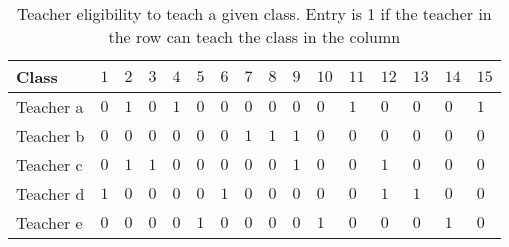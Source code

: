 \documentclass[11pt]{article}
\begin{document}
\begin{table}[h!]
\begin{tabular}{|a||l|l|l|l|l|l|l|l|l|l|l|l|l|l|l|} \hline
{}Class & $1$ & $2$ & $3$ & $4$ & $5$ & $6$ &
$7$ & $8$ & $9$ & $10$ & $11$ & $12$ & $13$
& $14$ & $15$ \\ \hline \hline
Teacher a & $0$ & $1$ & $0$ & $1$ & $0$ & $0$
& $0$ & $0$ & $0$ & $0$ & $1$ & $0$ & $0$
& $0$ & $1$ \\ \hline
Teacher b & $0$ & $0$ & $0$ & $0$ & $0$ & $0$
& $1$ & $1$ & $1$ & $0$ & $0$ & $0$ & $0$
& $0$ & $0$ \\ \hline
Teacher c & $0$ & $1$ & $1$ & $0$ & $0$ & $0$
& $0$ & $0$ & $1$ & $0$ & $0$ & $1$ & $0$
& $0$ & $0$ \\ \hline
Teacher d & $1$ & $0$ & $0$ & $0$ & $0$ & $1$
& $0$ & $0$ & $0$ & $0$ & $0$ & $1$ & $1$
& $0$ & $0$ \\ \hline
Teacher e & $0$ & $0$ & $0$ & $0$ & $1$ & $0$
& $0$ & $0$ & $0$ & $1$ & $0$ & $0$ & $0$
& $1$ & $0$ \\ \hline
\end{tabular}
\caption{Teacher eligibility to teach a given class. Entry is 1 if the teacher in the row can teach the class in the column}
\label{table:elig}
\end{table}
\end{document}
